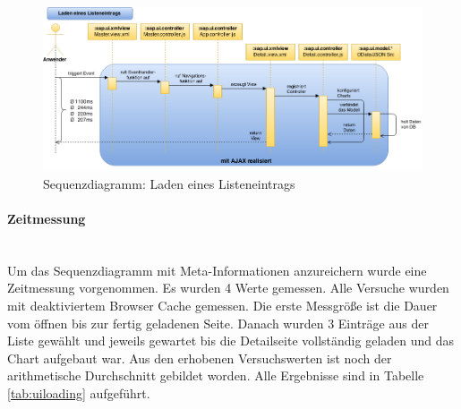 \vspace{1em}
\begin{figure}[htb]
  \centering
  \includegraphics[width=1.1\linewidth,angle=90]{abb/sapui5_load_list_entry}
  \caption[Sequenzdiagramm: Laden eines Listeneintrags]{Sequenzdiagramm: Laden eines Listeneintrags}
  \label{fig:sapui5loadlistentry}
\end{figure}

\paragraph{Zeitmessung}$\;$ \\
Um das Sequenzdiagramm mit Meta-Informationen anzureichern wurde eine Zeitmessung vorgenommen. Es wurden 4 Werte gemessen. Alle Versuche wurden mit deaktiviertem Browser Cache gemessen. Die erste Messgröße ist die Dauer vom öffnen bis zur fertig geladenen Seite. Danach wurden 3 Einträge aus der Liste gewählt und jeweils gewartet bis die Detailseite vollständig geladen und das Chart aufgebaut war. Aus den erhobenen Versuchswerten ist noch der arithmetische Durchschnitt gebildet worden. Alle Ergebnisse sind in Tabelle \ref{tab:uiloading} aufgeführt.

